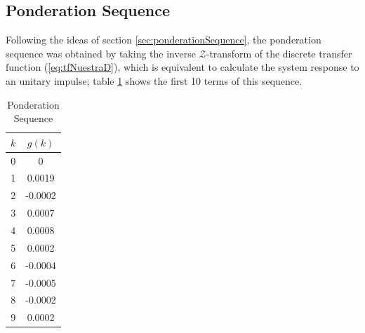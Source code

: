 
\subsection{Ponderation Sequence}
Following the ideas of section \ref{sec:ponderationSequence}, the ponderation sequence was obtained by taking the inverse $\mathcal{Z}$-transform of the discrete transfer function (\ref{eq:tfNuestraD}), which is equivalent to calculate the system response to an unitary impulse; table \ref{tab:ponderation} shows the first 10 terms of this sequence.

\begin{table}[H]
\centering
\begin{tabular}{cc}
\hline
\boldmath$k$ & \boldmath$g(k)$ \\ \hline
0 & 0 \\
1 & 0.0019 \\
2 & -0.0002 \\
3 & 0.0007 \\
4 & 0.0008 \\
5 & 0.0002 \\
6 & -0.0004 \\
7 & -0.0005 \\
8 & -0.0002 \\
9 & 0.0002 \\ \hline
\end{tabular}
\caption{Ponderation Sequence}
\label{tab:ponderation}
\end{table}

